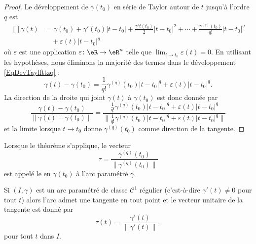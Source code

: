 \begin{proof}

	Le développement de \( \gamma(t_0)\) en série de Taylor autour de \( t\) jusqu'à l'ordre \( q\) est
	\begin{equation}        \label{EqDevTaylfttzq}
		\begin{aligned}[]
			\gamma(t) & =\gamma(t_0)+\gamma'(t_0)| t-t_0 |+\frac{ \gamma't(t_0) }{2}| t-t_0 |^2+\cdots +\frac{ \gamma^{(q)}(t_0) }{ q! }| t-t_0 |^q \\
			          & \quad+\varepsilon(t)| t-t_0 |^q
		\end{aligned}
	\end{equation}
	où \( \varepsilon\) est une application \( \varepsilon\colon \eR\to \eR^n\) telle que \( \lim_{t\to t_0} \varepsilon(t)=0\). En utilisant les hypothèses, nous éliminons la majorité des termes dans le développement \eqref{EqDevTaylfttzq} :
	\begin{equation}
		\gamma(t)-\gamma(t_0)=\frac{1}{ q! }\gamma^{(q)}(t_0)| t-t_0 |^q+\varepsilon(t)| t-t_0 |^q.
	\end{equation}
	La direction de la droite qui joint \( \gamma(t)\) à \( \gamma(t_0)\) est donc donnée par
	\begin{equation}
		\frac{ \gamma(t)-\gamma(t_0) }{ \| \gamma(t)-\gamma(t_0) \| }=\frac{ \frac{1}{ q! }\gamma^{(q)}(t_0)| t-t_0 |^q+\varepsilon(t)| t-t_0 |^q }{ \| \frac{1}{ q! }\gamma^{(q)}(t_0)| t-t_0 |^q+\varepsilon(t)| t-t_0 |^q\|  }
	\end{equation}
	et la limite lorsque \( t\to t_0\) donne \( \gamma^{(q)}(t_0)\) comme direction de la tangente.

\end{proof}

Lorsque le théorème s'applique, le vecteur
\begin{equation}
	\tau=\frac{ \gamma^{(q)}(t_0) }{ \| \gamma^{(q)}(t_0) \| }
\end{equation}
est appelé le  en \( \gamma(t_0)\) à l'arc paramétré \( \gamma\).


\begin{corollary}       \label{CorTgSoCun}
	Si \( (I,\gamma)\) est un arc paramétré de classe \( \mathcal{C}^1\) régulier (c'est-à-dire \( \gamma'(t)\neq 0\) pour tout \( t\)) alors l'arc admet une tangente en tout point et le vecteur unitaire de la tangente est donné par
	\begin{equation}
		\tau(t)=\frac{ \gamma'(t) }{ \| \gamma'(t) \| },
	\end{equation}
	pour tout \( t\) dans \( I\).
\end{corollary}

